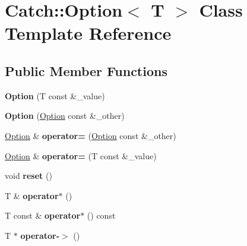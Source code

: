 \hypertarget{classCatch_1_1Option}{}\section{Catch\+:\+:Option$<$ T $>$ Class Template Reference}
\label{classCatch_1_1Option}
\subsection*{Public Member Functions}
\begin{DoxyCompactItemize}
\item 
\mbox{\label{classCatch_1_1Option_a5aeb9c22d48a6882bdf5fb4730b06c86}} 
{\bfseries Option} (T const \&\+\_\+value)
\item 
\mbox{\label{classCatch_1_1Option_af02f2e4559f06384baec0def8c68c5fd}} 
{\bfseries Option} (\hyperlink{classCatch_1_1Option}{Option} const \&\+\_\+other)
\item 
\mbox{\label{classCatch_1_1Option_a78c65b15dd6b2fbd04c5012c43017c8f}} 
\hyperlink{classCatch_1_1Option}{Option} \& {\bfseries operator=} (\hyperlink{classCatch_1_1Option}{Option} const \&\+\_\+other)
\item 
\mbox{\label{classCatch_1_1Option_a2be7e343ab22d6061726d32ab4622653}} 
\hyperlink{classCatch_1_1Option}{Option} \& {\bfseries operator=} (T const \&\+\_\+value)
\item 
\mbox{\label{classCatch_1_1Option_a37b4e0e5d4d56296adacd267a616f4e0}} 
void {\bfseries reset} ()
\item 
\mbox{\label{classCatch_1_1Option_afd989852fa453731c3190dac63caccb0}} 
T \& {\bfseries operator$\ast$} ()
\item 
\mbox{\label{classCatch_1_1Option_a734fc9c2eb1a1f7f8e8f6a4eb12160f0}} 
T const  \& {\bfseries operator$\ast$} () const
\item 
\mbox{\label{classCatch_1_1Option_acad340798a16c8f700f8763119e90f31}} 
T $\ast$ {\bfseries operator-\/$>$} ()
\item 

\end{DoxyCompactItemize}
